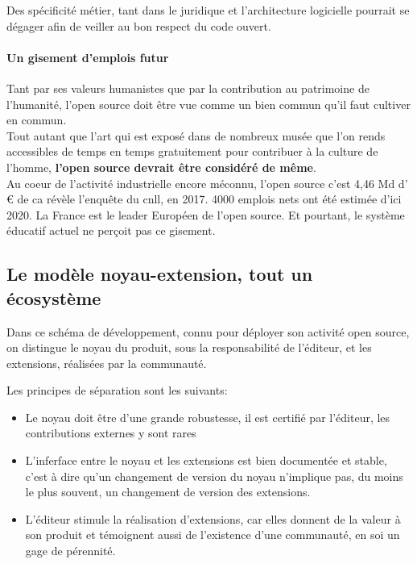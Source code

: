					Des spécificité métier, tant dans le juridique et l'architecture logicielle pourrait se dégager afin de veiller au bon respect du code ouvert.

				\paragraph{Un gisement d'emplois futur\\}

					Tant par ses valeurs humanistes que par la contribution au patrimoine de l'humanité, l'open source doit être vue comme un bien commun qu'il faut cultiver en commun.\\
					
					Tout autant que l'art qui est exposé dans de nombreux musée que l'on rends accessibles de temps en temps gratuitement pour contribuer à la culture de l'homme, \textbf{l'open source devrait être considéré de même}.\\

					Au coeur de l'activité industrielle encore méconnu, l'open source c'est 4,46 Md d' \euro{} de \acrshort{ca} révèle l'enquête du \acrfull{cnll}, en 2017. 4000 emplois nets ont été estimée d'ici 2020. La France est le leader Européen de l'open source. Et pourtant, le système éducatif actuel ne perçoit pas ce gisement. 

		\subsection{Le modèle noyau-extension, tout un écosystème}
			
			 Dans ce schéma de développement, connu pour déployer son activité open source, on distingue le noyau du produit, sous la responsabilité de l'éditeur, et les extensions, réalisées par la communauté.

				Les principes de séparation sont les suivants:

				\begin{itemize}[label=\textbullet, font=\LARGE \color{burntorange}]
					\item Le noyau doit être d'une grande robustesse, il est certifié par l'éditeur, les contributions externes y sont rares
					\item L'inferface entre le noyau et les extensions est bien documentée et stable, c'est à dire qu'un changement de version du noyau n'implique pas, du moins le plus souvent, un changement de version des extensions.	
					\item L'éditeur stimule la réalisation d'extensions, car elles donnent de la valeur à son produit et témoignent aussi de l'existence d'une communauté, en soi un gage de pérennité.
				\end{itemize}

